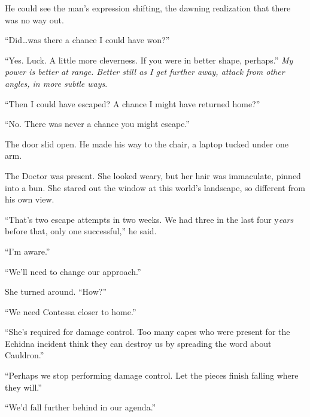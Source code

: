 He could see the man's expression shifting, the dawning realization that there was no way out.



``Did\ldots was there a chance I could have won?''



``Yes.  Luck.  A little more cleverness.  If you were in better shape, perhaps.''  \emph{My power is better at range.  Better still as I get further away, attack from other angles, in more subtle ways}.



``Then I could have escaped?  A chance I might have returned home?''



``No.  There was never a chance you might escape.''



\sectionbreak



The door slid open.  He made his way to the chair, a  laptop tucked under one arm.



The Doctor was present.  She looked weary, but her hair was immaculate, pinned into a bun.  She stared out the window at this world's landscape, so different from his own view.



``That's two escape attempts in two weeks.  We had three in the last four y\emph{ears} before that, only one successful,'' he said.



``I'm aware.''



``We'll need to change our approach.''



She turned around.  ``How?''



``We need Contessa closer to home.''



``She's required for damage control.  Too many capes who were present for the Echidna incident think they can destroy us by spreading the word about Cauldron.''



``Perhaps we stop performing damage control.  Let the pieces finish falling where they will.''



``We'd fall further behind in our agenda.''



